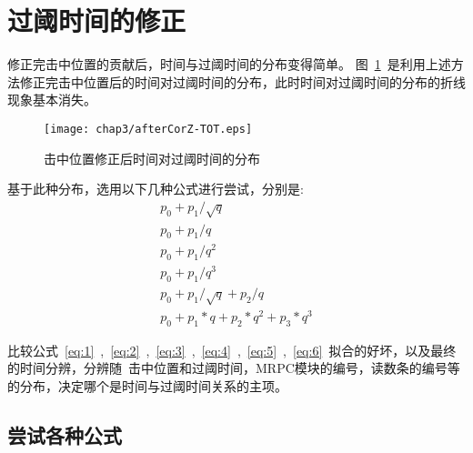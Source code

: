 \section{过阈时间的修正}
修正完击中位置的贡献后，时间与过阈时间的分布变得简单。
图~\ref{fig:afterCorZ-TOT}~是利用上述方法修正完击中位置后的时间对过阈时间的分布，此时时间对过阈时间的分布的折线现象基本消失。

\begin{figure}[htbp]
\centering
\texttt{[image: chap3/afterCorZ-TOT.eps]}
\caption{击中位置修正后时间对过阈时间的分布}
\label{fig:afterCorZ-TOT}
\end{figure}

基于此种分布，选用以下几种公式进行尝试，分别是:
\begin{align}
p_{0}+p_{1}/\sqrt{q}
\label{eq:1}\\
p_{0}+p_{1}/q
\label{eq:2}\\
p_{0}+p_{1}/q^{2}
\label{eq:3}\\
p_{0}+p_{1}/q^{3}
\label{eq:4}\\
p_{0}+p_{1}/\sqrt{q}+p_{2}/q
\label{eq:5}\\
p_{0}+p_{1}*q+p_{2}*q^{2}+p_{3}*q^3
\label{eq:6}    
\end{align}

比较公式~\ref{eq:1}~,~\ref{eq:2}~,~\ref{eq:3}~,~\ref{eq:4}~,~\ref{eq:5}~,~\ref{eq:6}~拟合的好坏，以及最终的时间分辨，分辨随~击中位置和过阈时间，MRPC模块的编号，读数条的编号等的分布，决定哪个是时间与过阈时间关系的主项。

\subsection{尝试各种公式}

